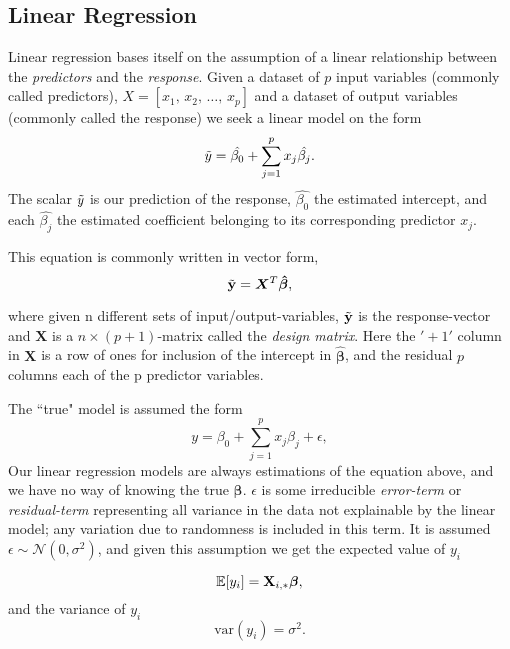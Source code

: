 \subsection{Linear Regression}
Linear regression bases itself on the assumption of a linear relationship between the \textit{predictors} and the \textit{response}. 
Given a dataset of $p$ input variables (commonly called predictors), $X=[x_1, \, x_2, \, \ldots, \, x_p]$ and a dataset of output variables (commonly called the response) we seek a linear model on the form
\begin{equation}
\Tilde{y}=\hat{\beta_0}+\sum_{j=1}^{p}x_j\hat{\beta_j}.
\end{equation}
The scalar $\Tilde{y}$ is our prediction of the response, $\hat{\beta_0}$ the estimated intercept, and each $\hat{\beta_j}$ the estimated coefficient belonging to its corresponding predictor $x_j$. 

This equation is commonly written in vector form, 
\begin{equation}
\Tilde{\mathbf{y}}=\boldsymbol{X}^T\boldsymbol{\hat{\beta}},
\end{equation}

where given n different sets of input/output-variables, $\Tilde{\mathbf{y}}$ is the response-vector and $\boldsymbol{X}$ is a $n\times (p+1)$-matrix called the \textit{design matrix}. Here the $'+1'$ column in $\boldsymbol{X}$ is a row of ones for inclusion of the intercept in $\boldsymbol{\hat{\beta}}$, and the residual $p$ columns each of the p predictor variables. 


The ``true" model is assumed the form 
\begin{equation}\label{OG_y}
y=\beta_0+\sum_{j=1}^{p}x_j\beta_j+\epsilon,
\end{equation}
Our linear regression models are always estimations of the equation above, and we have no way of knowing the true $\boldsymbol{\beta}$. 
$\epsilon$ is some irreducible \textit{error-term} or \textit{residual-term} representing all variance in the data not explainable by the linear model; any variation due to randomness is included in this term. It is assumed $\epsilon \sim  
\mathcal{N}(0,\sigma^2)$, and given this assumption we get the expected value of $y_i$

\begin{equation}
    \mathbb{E}[y_i] = \mathbf{X}_{i,*}\boldsymbol{\beta},
\end{equation}
and the variance of $y_i$
\begin{equation}
    \text{var}(y_i) = \sigma^2.
\end{equation}



